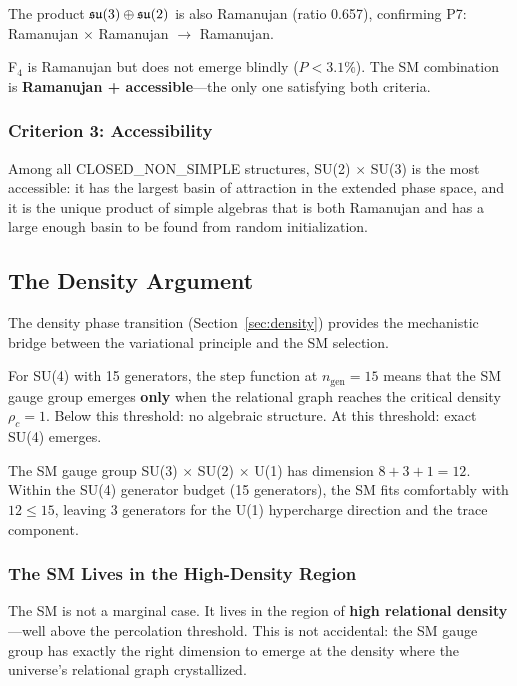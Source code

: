 The product $\mathfrak{su}(3) \oplus \mathfrak{su}(2)$ is also Ramanujan (ratio 0.657), confirming P7: Ramanujan $\times$ Ramanujan $\to$ Ramanujan.

F$_4$ is Ramanujan but does not emerge blindly ($P < 3.1\%$). The SM combination is \textbf{Ramanujan + accessible}---the only one satisfying both criteria.

\subsubsection{Criterion 3: Accessibility}

Among all CLOSED\_NON\_SIMPLE structures, SU(2) $\times$ SU(3) is the most accessible: it has the largest basin of attraction in the extended phase space, and it is the unique product of simple algebras that is both Ramanujan and has a large enough basin to be found from random initialization.

\subsection{The Density Argument}\label{sec:density_argument}

The density phase transition (Section~\ref{sec:density}) provides the mechanistic bridge between the variational principle and the SM selection.

For SU(4) with 15 generators, the step function at $n_{\mathrm{gen}} = 15$ means that the SM gauge group emerges \textbf{only} when the relational graph reaches the critical density $\rho_c = 1$. Below this threshold: no algebraic structure. At this threshold: exact SU(4) emerges.

The SM gauge group SU(3) $\times$ SU(2) $\times$ U(1) has dimension $8 + 3 + 1 = 12$. Within the SU(4) generator budget (15 generators), the SM fits comfortably with $12 \leq 15$, leaving 3 generators for the U(1) hypercharge direction and the trace component.

\subsubsection{The SM Lives in the High-Density Region}

The SM is not a marginal case. It lives in the region of \textbf{high relational density}---well above the percolation threshold. This is not accidental: the SM gauge group has exactly the right dimension to emerge at the density where the universe's relational graph crystallized.

